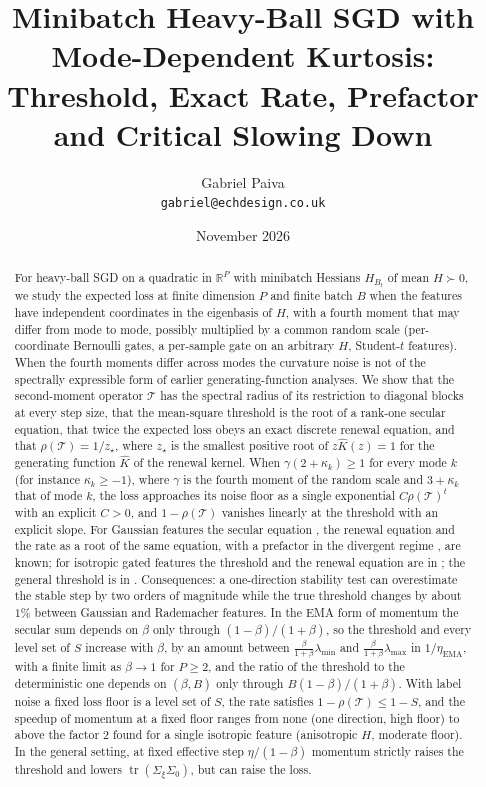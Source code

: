 \documentclass[11pt]{article}
\title{Minibatch Heavy-Ball SGD with Mode-Dependent Kurtosis:\\ Threshold, Exact Rate, Prefactor and Critical Slowing Down}
\author{Gabriel Paiva\\ \texttt{gabriel@echdesign.co.uk}}
\date{November 2026}
\theoremstyle{remark}
\newcommand{\R}{\mathbb{R}}
\newcommand{\tr}{\operatorname{tr}}
\newcommand{\T}{\mathcal T}
\begin{document}
\maketitle

\begin{abstract}
For heavy-ball SGD on a quadratic in $\R^P$ with minibatch Hessians $H_{B_t}$ of mean $H\succ0$, we study the expected loss at finite dimension $P$ and finite batch $B$ when the features have independent coordinates in the eigenbasis of $H$, with a fourth moment that may differ from mode to mode, possibly multiplied by a common random scale (per-coordinate Bernoulli gates, a per-sample gate on an arbitrary $H$, Student-$t$ features). When the fourth moments differ across modes the curvature noise is not of the spectrally expressible form of earlier generating-function analyses. We show that the second-moment operator $\T$ has the spectral radius of its restriction to diagonal blocks at every step size, that the mean-square threshold is the root of a rank-one secular equation, that twice the expected loss obeys an exact discrete renewal equation, and that $\rho(\T)=1/z_\star$, where $z_\star$ is the smallest positive root of $z\widehat K(z)=1$ for the generating function $\widehat K$ of the renewal kernel. When $\gamma(2+\kappa_k)\ge1$ for every mode $k$ (for instance $\kappa_k\ge-1$), where $\gamma$ is the fourth moment of the random scale and $3+\kappa_k$ that of mode $k$, the loss approaches its noise floor as a single exponential $C\rho(\T)^t$ with an explicit $C>0$, and $1-\rho(\T)$ vanishes linearly at the threshold with an explicit slope. For Gaussian features the secular equation \citep{ziyin2022strength,wang2026momentum}, the renewal equation \citep{wang2026momentum} and the rate as a root of the same equation, with a prefactor in the divergent regime \citep{velikanov2023view}, are known; for isotropic gated features the threshold and the renewal equation are in \citet{everett2026sparse}; the general threshold is in \citet{cai2026llm}. Consequences: a one-direction stability test can overestimate the stable step by two orders of magnitude while the true threshold changes by about $1\%$ between Gaussian and Rademacher features. In the EMA form of momentum the secular sum depends on $\beta$ only through $(1-\beta)/(1+\beta)$, so the threshold and every level set of $S$ increase with $\beta$, by an amount between $\frac{\beta}{1+\beta}\lambda_{\min}$ and $\frac{\beta}{1+\beta}\lambda_{\max}$ in $1/\eta_{\mathrm{EMA}}$, with a finite limit as $\beta\to1$ for $P\ge2$, and the ratio of the threshold to the deterministic one depends on $(\beta,B)$ only through $B(1-\beta)/(1+\beta)$. With label noise a fixed loss floor is a level set of $S$, the rate satisfies $1-\rho(\T)\le1-S$, and the speedup of momentum at a fixed floor ranges from none (one direction, high floor) to above the factor $2$ found for a single isotropic feature (anisotropic $H$, moderate floor). In the general setting, at fixed effective step $\eta/(1-\beta)$ momentum strictly raises the threshold and lowers $\tr(\Sigma_\xi\Sigma_0)$, but can raise the loss.
\end{abstract}
\end{document}
